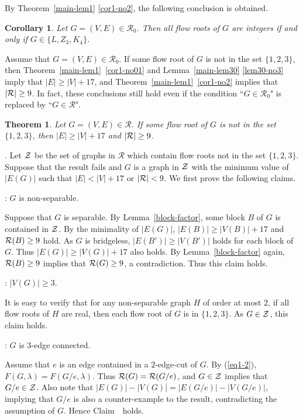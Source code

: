 \documentclass[11pt]{article}
\newtheorem{theo}{Theorem}
\newtheorem{cor}{Corollary}
\newcommand {\red} {\textcolor{red}}
\newcommand{\proof}
{{\noindent {\em Proof}.\quad}\setcounter{countclaim}{0}
\setcounter{countcase}{0}}
\newcounter{countclaim}
\def\inclaim{\addtocounter{countclaim}{1}
{\noindent {\bf Claim \thecountclaim}: }}
\newcounter{countcase}
\def\setz{{\cal Z}}
\def \setr{{\cal R}}
\def \setgr {\mathscr{R}}
\newcommand {\relabel}[1] {\label{#1} \red{[*: #1]}}\newcommand {\rebibitem}[1] {\bibitem{#1} \red{[*: #1]}}%
\def\relabel {\label} \def\rebibitem {\bibitem}  %
\begin{document}
By Theorem~\ref{main-lem1} \ref{cor1-no2}, the following 
conclusion is obtained. 

\begin{cor}
\relabel{main-lem1-cor0}
Let $G=(V,E)\in \setgr_0$.
Then all flow roots of $G$ are integers if and only if 
$G\in \{L, Z_3,K_4\}$.
\end{cor}


Assume that $G=(V,E)\in \setgr_0$.
If some flow root of $G$ is not in the set $\{1,2,3\}$, 
then Theorem~\ref{main-lem1}~\ref{cor1-no01} and 
Lemma~\ref{main-lem30} \ref{lem30-no3} imply that 
$|E|\ge |V|+17$, 
and Theorem~\ref{main-lem1}~\ref{cor1-no2}
implies that $|\setr|\ge 9$.
In fact, these conclusions  still hold even if the condition
``$G\in \setgr_0$" is replaced by 
``$G\in \setgr$".


\begin{theo} \relabel{main-lem1-cor}
Let $G=(V,E)\in \setgr$. 
If some flow root of $G$ is not in the set $\{1,2,3\}$,
then $|E|\ge |V|+17$ and 
$|\setr|\ge 9$.
\end{theo}

\proof 
Let $\setz$ be the set of graphs in $\setgr$ 
which contain flow roots not in the set $\{1,2,3\}$.
Suppose that the result fails and 
$G$ is a graph in $\setz$ with the minimum value of 
$|E(G)|$ such that $|E|<|V|+17$ or $|\setr|<9$.
We first prove the following claims.

\inclaim $G$ is non-separable. 


Suppose that $G$ is separable. 
By Lemma~\ref{block-factor}, 
some block $B$ of $G$ is contained in $\setz$.
By the minimality of $|E(G)|$, 
$|E(B)|\ge |V(B)|+17$ and $\setr(B)\ge 9$ hold.
As $G$ is bridgeless,
$|E(B')|\ge |V(B')|$ holds for each block of $G$.
Thus $|E(G)|\ge |V(G)|+17$ also holds.
By Lemma~\ref{block-factor} again,
$\setr(B)\ge 9$ implies that  $\setr(G)\ge 9$,
a contradiction. 
Thus  this claim holds. 

\inclaim $|V(G)|\ge 3$.

It is easy to verify that 
for any non-separable graph $H$ of order at most $2$, 
if all flow roots of $H$ are real, 
then each flow root of $G$ is in $\{1,2,3\}$.
As $G\in \setz$,  this claim holds.


\inclaim 
$G$ is $3$-edge connected.

Assume that $e$ is an edge 
contained in a $2$-edge-cut of $G$.  
By (\ref{eq1-2}), 
$F(G,\lambda)=F(G/e,\lambda)$.
Thus $\setr(G)=\setr(G/e)$, and 
$G\in \setz$ implies that  $G/e\in \setz$.
Also note that 
$|E(G)|-|V(G)|=|E(G/e)|-|V(G/e)|$,
implying that 
$G/e$ is also a counter-example to the result,
contradicting the assumption of $G$. 
Hence Claim~\thecountclaim\ holds.
\end{document}
